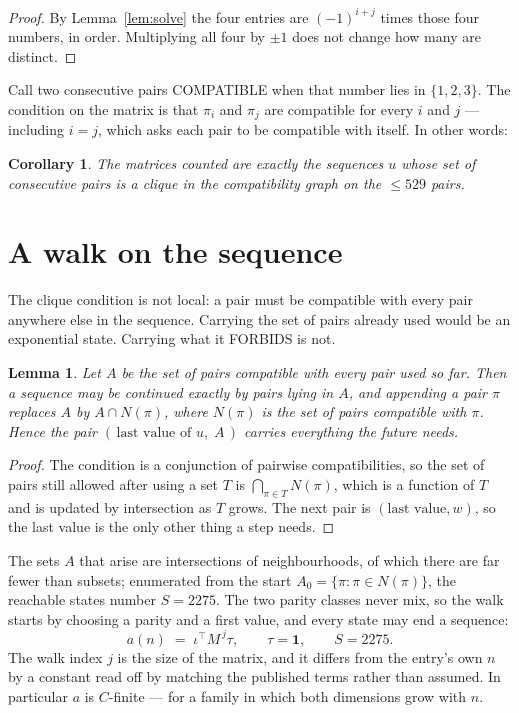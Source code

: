 \documentclass[11pt,a4paper]{article}
\theoremstyle{plain}
\newtheorem{lemma}[theorem]{Lemma}
\newtheorem{corollary}[theorem]{Corollary}
\theoremstyle{definition}
\begin{document}
\begin{proof}
By Lemma~\ref{lem:solve} the four entries are $(-1)^{i+j}$ times those four numbers, in
order. Multiplying all four by $\pm1$ does not change how many are distinct.
\end{proof}

Call two consecutive pairs COMPATIBLE when that number lies in $\{1,2,3\}$. The condition on the
matrix is that $\pi_i$ and $\pi_j$ are compatible for every $i$ and $j$ --- including $i=j$,
which asks each pair to be compatible with itself. In other words:

\begin{corollary}
The matrices counted are exactly the sequences $u$ whose set of consecutive pairs is a clique in
the compatibility graph on the $\le 529$ pairs.
\end{corollary}

\section{A walk on the sequence}

The clique condition is not local: a pair must be compatible with every pair anywhere else in
the sequence. Carrying the set of pairs already used would be an exponential state. Carrying
what it FORBIDS is not.

\begin{lemma}\label{lem:lump}
Let $A$ be the set of pairs compatible with every pair used so far. Then a sequence may be
continued exactly by pairs lying in $A$, and appending a pair $\pi$ replaces $A$ by
$A\cap N(\pi)$, where $N(\pi)$ is the set of pairs compatible with $\pi$. Hence the pair
$(\,\text{last value of }u,\;A\,)$ carries everything the future needs.
\end{lemma}

\begin{proof}
The condition is a conjunction of pairwise compatibilities, so the set of pairs still allowed
after using a set $T$ is $\bigcap_{\pi\in T}N(\pi)$, which is a function of $T$ and is updated
by intersection as $T$ grows. The next pair is $(\text{last value},w)$, so the last value is
the only other thing a step needs.
\end{proof}

The sets $A$ that arise are intersections of neighbourhoods, of which there are far fewer than
subsets; enumerated from the start $A_0=\{\pi:\pi\in N(\pi)\}$, the reachable states number
$S=2275$. The two parity classes never mix, so the walk starts by choosing a parity and a first
value, and every state may end a sequence:
\[
a(n)\;=\;\iota^{\!\top}M^{\,j}\tau ,\qquad \tau=\mathbf{1},\qquad S=2275.
\]
The walk index $j$ is the size of the matrix, and it differs from the entry's own $n$ by a
constant read off by matching the published terms rather than assumed. In particular $a$ is
$C$-finite --- for a family in which both dimensions grow with $n$.
\end{document}
